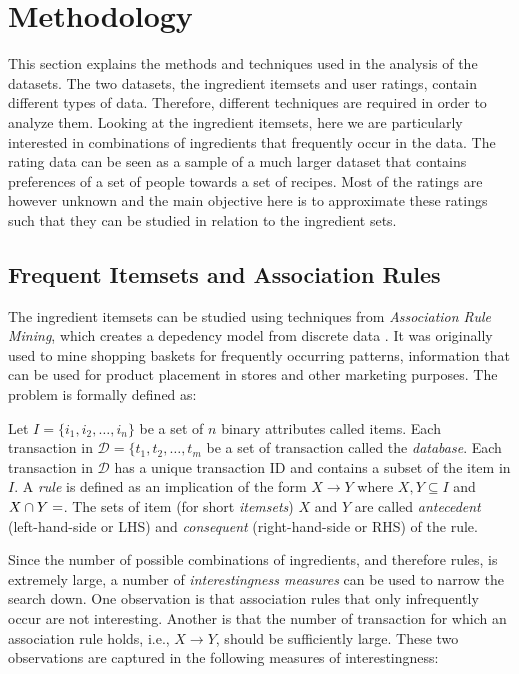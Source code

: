\section{Methodology}
\label{sec:methodology}

This section explains the methods and techniques used in the analysis of the datasets.
The two datasets, the ingredient itemsets and user ratings, contain different types of data.
Therefore, different techniques are required in order to analyze them.
Looking at the ingredient itemsets, here we are particularly interested in combinations of ingredients that frequently occur in the data.
The rating data can be seen as a sample of a much larger dataset that contains preferences of a set of people towards a set of recipes.
Most of the ratings are however unknown and the main objective here is to approximate these ratings such that they can be studied in relation to the ingredient sets.




\subsection{Frequent Itemsets and Association Rules}
\label{subsec:frequent_itemsets}

The ingredient itemsets can be studied using techniques from \emph{Association Rule Mining}, which creates a depedency model from discrete data \citep{Agrawal1993}.
It was originally used to mine shopping baskets for frequently occurring patterns, information that can be used for product placement in stores and other marketing purposes.
The problem is formally defined as:

\begin{definition}
	Let $I = \{i_1, i_2, \dots, i_n\}$ be a set of $n$ binary attributes called items. Each transaction in $\mathcal{D}=\{t_1, t_2, \dots, t_m$ be a set of transaction called the \emph{database}. Each transaction in $\mathcal{D}$ has a unique transaction ID and contains a subset of the item in $I$. A \emph{rule} is defined as an implication of the form $X \rightarrow Y$ where $X,Y \subseteq I$ and $X \cap Y=\empty$. The sets of item (for short \emph{itemsets}) $X$ and $Y$ are called \emph{antecedent} (left-hand-side or LHS) and \emph{consequent} (right-hand-side or RHS) of the rule.
\end{definition}

Since the number of possible combinations of ingredients, and therefore rules, is extremely large, a number of \emph{interestingness measures} can be used to narrow the search down.
One observation is that association rules that only infrequently occur are not interesting.
Another is that the number of transaction for which an association rule holds, i.e., $X \rightarrow Y$, should be sufficiently large.
These two observations are captured in the following measures of interestingness:

